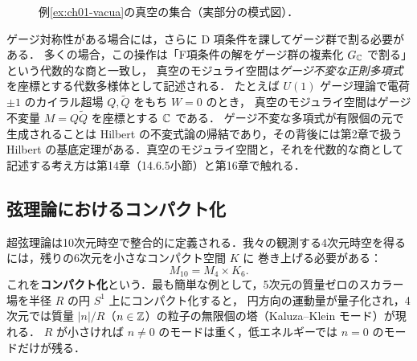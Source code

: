 \begin{figure}[H]
\centering
{}
\caption{例\ref{ex:ch01-vacua}の真空の集合（実部分の模式図）．}
\label{fig:ch01-vacua}
\end{figure}

ゲージ対称性がある場合には，さらに D 項条件を課してゲージ群で割る必要がある．
多くの場合，この操作は「F項条件の解をゲージ群の複素化 $G_{\mathbb{C}}$ で割る」という代数的な商と一致し，
真空のモジュライ空間は\emph{ゲージ不変な正則多項式}を座標とする代数多様体として記述される．
たとえば $U(1)$ ゲージ理論で電荷 $\pm1$ のカイラル超場 $Q,\tilde Q$ をもち $W=0$ のとき，
真空のモジュライ空間はゲージ不変量 $M=Q\tilde Q$ を座標とする $\mathbb{C}$ である．
ゲージ不変な多項式が有限個の元で生成されることは Hilbert の不変式論の帰結であり，その背後には第2章で扱う
Hilbert の基底定理がある．真空のモジュライ空間と，それを代数的な商として記述する考え方は第14章（14.6.5小節）と第16章で触れる．

\subsection{弦理論におけるコンパクト化}

超弦理論は10次元時空で整合的に定義される．我々の観測する4次元時空を得るには，残りの6次元を小さなコンパクト空間 $K$ に
巻き上げる必要がある：
\[
  M_{10}=M_4\times K_6.
\]
これを\textbf{コンパクト化}という．最も簡単な例として，5次元の質量ゼロのスカラー場を半径 $R$ の円 $S^1$ 上にコンパクト化すると，
円方向の運動量が量子化され，4次元では質量 $|n|/R$（$n\in\mathbb{Z}$）の粒子の無限個の塔（Kaluza--Klein モード）が現れる．
$R$ が小さければ $n\ne0$ のモードは重く，低エネルギーでは $n=0$ のモードだけが残る．

